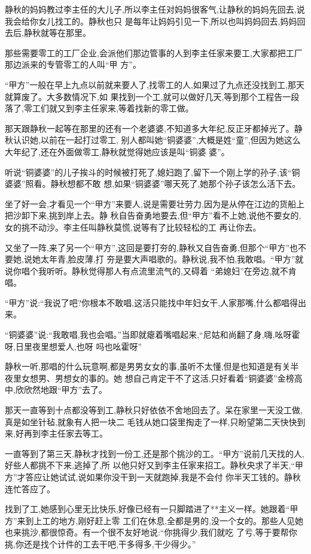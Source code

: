 ﻿\documentclass[12pt]{article}
\begin{document}
静秋的妈妈教过李主任的大儿子,所以李主任对妈妈很客气,让静秋的妈妈先回去,说我会给你女儿找工的。静秋也只
是每年让妈妈引见一下,所以也叫妈妈回去,妈妈回去后,静秋就等在那里。

那些需要零工的工厂企业,会派他们那边管事的人到李主任家来要工,大家都把工厂那边派来的专管零工的人叫``甲
方''。

``甲方''一般在早上九点以前就来要人了,找零工的人,如果过了九点还没找到工,那天就算废了。大多数情况下,如
果找到一个工,就可以做好几天,等到那个工程告一段落了,零工们就又到李主任家来,等着找新的零工做。

那天跟静秋一起等在那里的还有一个老婆婆,不知道多大年纪,反正牙都掉光了。静秋认识她,以前在一起打过零工,
别人都叫她``铜婆婆'',大概是姓``童'',但因为她这么大年纪了,还在外面做零工,静秋就觉得她应该是叫``铜婆
婆''。

听说``铜婆婆''的儿子挨斗的时候被打死了,媳妇跑了,留下一个刚上学的孙子,该``铜婆婆''照看。静秋想都不敢
想,如果``铜婆婆''哪天死了,她那个孙子该怎么活下去。

坐了好一会,才看见一个``甲方''来要人,说是需要壮劳力,因为是从停在江边的货船上把沙卸下来,挑到岸上去。静
秋自告奋勇地要去,但``甲方''看不上她,说他不要女的,女的挑不动沙。李主任叫静秋莫慌,说等有了比较轻松的工
再让你去。

又坐了一阵,来了另一个``甲方'',这回是要打夯的,静秋又自告奋勇,但那个``甲方''也不要她,说她太年青,脸皮薄,打
夯是要大声唱歌的。静秋说,我不怕,我敢唱。``甲方''就说你唱个我听听。静秋觉得那人有点流里流气的,又碍着
``弟媳妇''在旁边,就不肯唱。

``甲方''说:``我说了吧?你根本不敢唱,这活只能找中年妇女干,人家那嘴,什么都唱得出来。

``铜婆婆''说:``我敢唱,我也会唱。''当即就瘪着嘴唱起来,``尼姑和尚翻了身,嗨,吆呀霍呀,日里夜里想爱人,也呀
吗也吆霍呀\myrule ''

静秋一听,那唱的什么玩意啊,都是男男女女的事,虽听不太懂,但是也知道是有关半夜里女想男、男想女的事的。她
想自己肯定干不了这活,只好看着``铜婆婆''金榜高中,欣欣然地跟``甲方''去了。

那天一直等到十点都没等到工,静秋只好依依不舍地回去了。呆在家里一天没工做,真是如坐针毡,就象有人把一块二
毛钱从她口袋里掏走了一样,只盼望第二天快快到来,好再到李主任家去等工。

一直等到了第三天,静秋才找到一份工,还是那个挑沙的工。``甲方''说前几天找的人,好些人都挑不下来,逃掉了,所
以他只好又到李主任家来招工。静秋央求了半天,``甲方''才答应让她试试,说如果你没干到一天就跑掉,我是不会付
你半天工钱的。静秋连忙答应了。

找到了工,她感到心里无比快乐,好像已经有一只脚踏进了**主义一样。她跟着``甲方''来到上工的地方,刚好赶上零
工们在休息,全都是男的,没一个女的。那些人见她也来挑沙,都很惊奇。有一个很不友好地说:``你挑得少,我们就吃
了亏,等于要帮你挑,你还是找个计件的工去干吧,干多得多,干少得少。''
\end{document}
